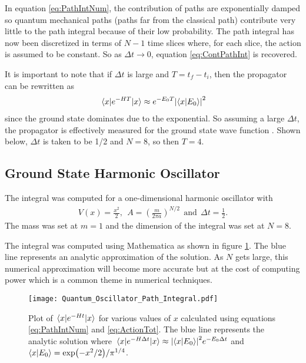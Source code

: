 \documentclass[11pt]{article}
\begin{document}
In equation \ref{eq:PathIntNum}, the contribution of paths are exponentially damped so quantum mechanical paths (paths far from the classical path) contribute very little to the path integral because of their low probability. The path integral has now been discretized in terms of $N-1$ time slices where, for each slice, the action is assumed to be constant. So as $\Delta t\to0$, equation \ref{eq:ContPathInt} is recovered.

It is important to note that if $\Delta t$ is large and $T=t_f-t_i$, then the propagator can be rewritten as
\begin{align}
	\mel{x}{e^{-HT}}{x}\approx e^{-E_0T}\abs{\bra{x}\ket{E_0}}^2
\end{align}
since the ground state dominates due to the exponential. So assuming a large $\Delta t$, the propagator is effectively measured for the ground state wave function \cite{MainPaper}. Shown below, $\Delta t$ is taken to be 1/2 and $N=8$, so then $T=4$.

\subsection{Ground State Harmonic Oscillator}
The integral was computed for a one-dimensional harmonic oscillator with
\begin{align}
V(x)=\frac{x^2}{2},\ \ A=\left(\frac{m}{2\pi a}\right)^{N/2}\ \ \text{and}\ \ \Delta t=\frac{1}{2}.
\end{align}
The mass was set at $m=1$ and the dimension of the integral was set at $N=8$. 

The integral was computed using Mathematica as shown in figure \ref{fig:QHO}. The blue line represents an analytic approximation of the solution. As $N$ gets large, this numerical approximation will become more accurate but at the cost of computing power  which is a common theme in numerical techniques. 
\begin{figure}[h]
	\centering
	\texttt{[image: Quantum\_Oscillator\_Path\_Integral.pdf]}
	\caption{Plot of $\mel{x}{e^{-Ht}}{x}$ for various values of $x$ calculated using equations \ref{eq:PathIntNum} and \ref{eq:ActionTot}. The blue line represents the analytic solution where $\mel{x}{e^{-H\Delta t}}{x}\approx\abs{\bra{x}\ket{E_0}}^2e^{-E_0\Delta t}$ and $\bra{x}\ket{E_0}=\exp(-x^2/2)/\pi^{1/4}$.}
	\label{fig:QHO}
\end{figure}
\end{document}
